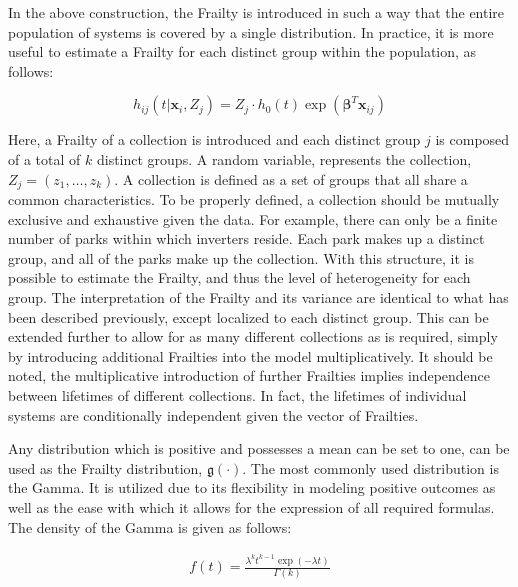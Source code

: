 In the above construction, the Frailty is introduced in such a way that the entire population of systems is covered by a single distribution. In practice, it is more useful to estimate a Frailty for each distinct group within the population, as follows:

$$ h_{ij}(t|\textbf{x}_i, Z_j) = Z_j \cdot h_0(t) \exp(\boldsymbol\beta^T \textbf{x}_{ij})  $$

Here, a Frailty of a collection is introduced and each distinct group $j$ is composed of a total of $k$ distinct groups. A random variable, represents the collection, $Z_j = (z_1, \dots, z_k)$. A collection is defined as a set of groups that all share a common characteristics. To be properly defined, a collection should be mutually exclusive and exhaustive given the data. For example, there can only be a finite number of parks within which inverters reside. Each park makes up a distinct group, and all of the parks make up the collection. With this structure, it is possible to estimate the Frailty, and thus the level of heterogeneity for each group. The interpretation of the Frailty and its variance are identical to what has been described previously, except localized to each distinct group. This can be extended further to allow for as many different collections as is required, simply by introducing additional Frailties into the model multiplicatively. It should be noted, the multiplicative introduction of further Frailties implies independence between lifetimes of different collections. In fact, the lifetimes of individual systems are conditionally independent given the vector of Frailties. 



Any distribution which is positive and possesses a mean can be set to one, can be used as the Frailty distribution, $\mathfrak{g}(\cdot)$. The most commonly used distribution is the Gamma. It is utilized due to its flexibility in modeling positive outcomes as well as the ease with which it allows for the expression of all required formulas\cite{Wienke2010}. The density of the Gamma is given as follows:

\begin{align*}
f(t) = \frac{\lambda^k t^{k-1} \exp(-\lambda t)}{\Gamma(k)} \tag{$ k>0, \lambda > 0 $}
\end{align*}



